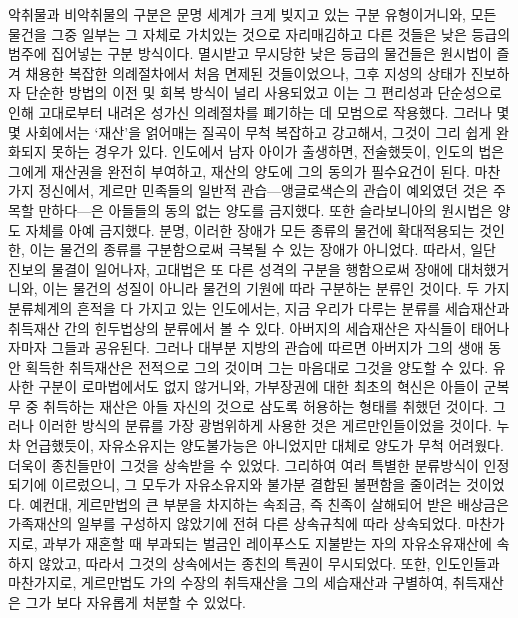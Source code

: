 악취물과 비악취물의 구분은 문명 세계가 크게 빚지고 있는 구분 유형이거니와,
모든 물건을 그중 일부는 그 자체로 가치있는 것으로 자리매김하고
다른 것들은 낮은 등급의 범주에 집어넣는 구분 방식이다.
멸시받고 무시당한
낮은 등급의 물건들은
원시법이 즐겨 채용한 복잡한 의례절차에서 처음 면제된 것들이었으나,
그후 지성의 상태가 진보하자
단순한 방법의 이전 및 회복 방식이 널리 사용되었고 이는
그 편리성과 단순성으로 인해
고대로부터 내려온 성가신 의례절차를 폐기하는 데 모범으로 작용했다.
그러나 몇몇 사회에서는
`재산'을 얽어매는 질곡이 무척 복잡하고 강고해서,
그것이 그리 쉽게 완화되지 못하는 경우가 있다.
인도에서 남자 아이가 출생하면,
전술했듯이,
인도의 법은 그에게 재산권을 완전히 부여하고,
재산의 양도에 그의 동의가 필수요건이 된다.
마찬가지 정신에서,
게르만 민족들의 일반적 관습---앵글로색슨의 관습이 예외였던 것은
주목할 만하다---은
아들들의 동의 없는 양도를 금지했다.
또한 슬라보니아의 원시법은 양도 자체를 아예 금지했다.
분명, 이러한 장애가
모든 종류의 물건에 확대적용되는 것인 한, 이는
물건의 종류를 구분함으로써 극복될 수 있는 장애가 아니었다.
따라서, 일단 진보의 물결이 일어나자,
고대법은 또 다른 성격의 구분을 행함으로써 장애에 대처했거니와,
이는 물건의 성질이 아니라 물건의 기원에 따라 구분하는 분류인 것이다.
두 가지 분류체계의 흔적을 다 가지고 있는
인도에서는, 지금 우리가 다루는 분류를
세습재산과
취득재산 간의 힌두법상의 분류에서 볼 수 있다.
아버지의 세습재산은 자식들이 태어나자마자 그들과 공유된다.
그러나 대부분 지방의 관습에 따르면
아버지가 그의 생애 동안 획득한 취득재산은 전적으로 그의 것이며
그는 마음대로 그것을 양도할 수 있다.
유사한 구분이 로마법에서도 없지 않거니와,
가부장권에 대한 최초의 혁신은
아들이 군복무 중 취득하는 재산은 아들 자신의 것으로 삼도록
허용하는 형태를 취했던 것이다.
그러나 이러한 방식의 분류를 가장 광범위하게 사용한 것은
게르만인들이었을 것이다.
누차 언급했듯이,
자유소유지는 양도불가능은 아니었지만
대체로 양도가 무척 어려웠다.
더욱이 종친들만이 그것을 상속받을 수 있었다.
그리하여 여러 특별한 분류방식이 인정되기에 이르렀으니,
그 모두가 자유소유지와 불가분 결합된 불편함을 줄이려는 것이었다.
예컨대,
게르만법의 큰 부분을 차지하는
속죄금, 즉
친족이 살해되어 받은 배상금은
가족재산의 일부를 구성하지 않았기에
전혀 다른 상속규칙에 따라 상속되었다.
마찬가지로,
과부가 재혼할 때 부과되는 벌금인
레이푸스도
지불받는 자의 자유소유재산에 속하지 않았고,
따라서 그것의 상속에서는 종친의 특권이 무시되었다.
또한, 인도인들과 마찬가지로,
게르만법도
가의 수장의 취득재산을 그의 세습재산과 구별하여,
취득재산은 그가 보다 자유롭게 처분할 수 있었다.
